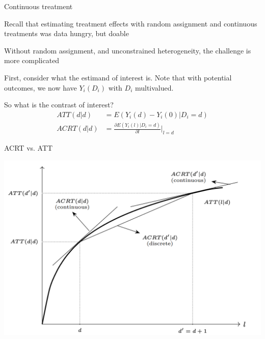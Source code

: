 \documentclass[notes,11pt, aspectratio=169]{beamer}
\newenvironment{wideitemize}{\itemize\addtolength{\itemsep}{10pt}}{\enditemize}
\begin{document}
\begin{frame}{Continuous treatment}
  \begin{wideitemize}
  \item Recall that estimating treatment effects with random
    assignment and continuous treatments was data hungry, but doable
  \item Without random assignment, and unconstrained heterogeneity,
    the challenge is more complicated
  \item First, consider what the estimand of interest is. Note that with potential outcomes, we now have $Y_{i}(D_{i})$ with $D_{i}$ multivalued.
  \item So what is the contrast of interest?
    \begin{align}
      ATT(d|d) &= E(Y_{i}(d) - Y_{i}(0) | D_{i} = d)\\
      ACRT(d|d) &= \frac{\partial E(Y_{i}(l) | D_{i} = d)}{\partial l}\bigg\rvert_{l = d}
    \end{align}
  \end{wideitemize}
\end{frame}


\begin{frame}{ACRT vs. ATT}
  \begin{center}
    \includegraphics[width=0.75\linewidth]{images/acrt_1.png}
  \end{center}
\end{frame}
\end{document}
